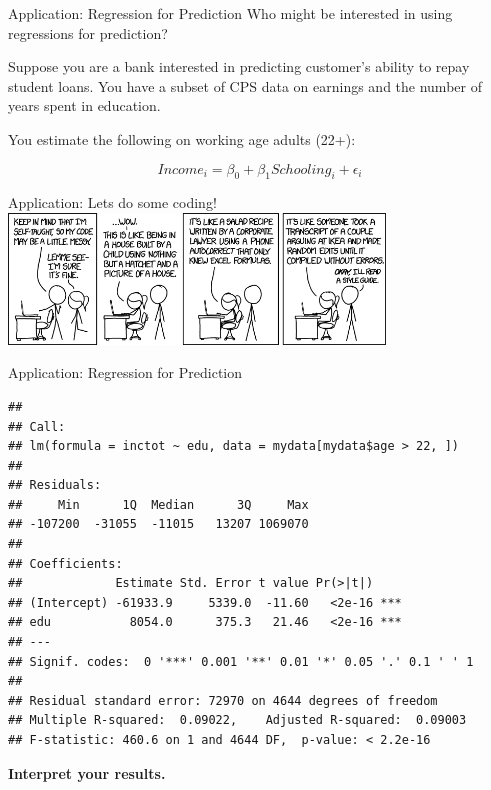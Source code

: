 \documentclass[
  ignorenonframetext,
]{beamer}
\newenvironment{Shaded}{\begin{snugshade}}{\end{snugshade}}
\newcommand{\DecValTok}[1]{\textcolor[rgb]{0.00,0.00,0.81}{#1}}
\newcommand{\KeywordTok}[1]{\textcolor[rgb]{0.13,0.29,0.53}{\textbf{#1}}}
\newcommand{\NormalTok}[1]{#1}
\newcommand{\OperatorTok}[1]{\textcolor[rgb]{0.81,0.36,0.00}{\textbf{#1}}}
\newcommand{\StringTok}[1]{\textcolor[rgb]{0.31,0.60,0.02}{#1}}
\begin{document}
\begin{frame}{Application: Regression for Prediction}
\protect\hypertarget{application-regression-for-prediction}{}
Who might be interested in using regressions for prediction?

Suppose you are a bank interested in predicting customer's ability to
repay student loans. You have a subset of CPS data on earnings and the
number of years spent in education.

You estimate the following on working age adults (22+):

\[
Income_i=\beta_0+\beta_1 Schooling_i+\epsilon_i
\]
\end{frame}

\begin{frame}{Application: Lets do some coding!}
\protect\hypertarget{application-lets-do-some-coding}{}
\center \includegraphics[width=0.75\textwidth,height=\textheight]{"images/code_quality.png"}
\end{frame}

\begin{frame}[fragile]{Application: Regression for Prediction}
\protect\hypertarget{application-regression-for-prediction-1}{}
\tiny

\begin{Shaded}
\end{Shaded}

\begin{verbatim}
## 
## Call:
## lm(formula = inctot ~ edu, data = mydata[mydata$age > 22, ])
## 
## Residuals:
##     Min      1Q  Median      3Q     Max 
## -107200  -31055  -11015   13207 1069070 
## 
## Coefficients:
##             Estimate Std. Error t value Pr(>|t|)    
## (Intercept) -61933.9     5339.0  -11.60   <2e-16 ***
## edu           8054.0      375.3   21.46   <2e-16 ***
## ---
## Signif. codes:  0 '***' 0.001 '**' 0.01 '*' 0.05 '.' 0.1 ' ' 1
## 
## Residual standard error: 72970 on 4644 degrees of freedom
## Multiple R-squared:  0.09022,    Adjusted R-squared:  0.09003 
## F-statistic: 460.6 on 1 and 4644 DF,  p-value: < 2.2e-16
\end{verbatim}

\textbf{Interpret your results.}
\end{frame}
\end{document}
